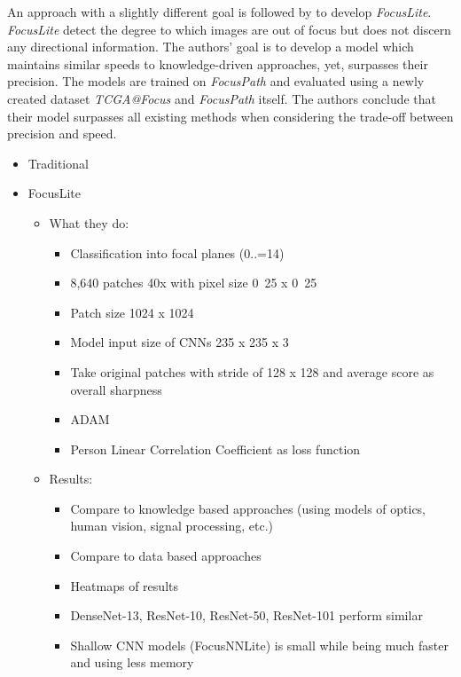 An approach with a slightly different goal is followed by \textcite{wang2020focuslitenn} to develop \emph{FocusLite}. \emph{FocusLite} detect the degree to which images are out of focus but does not discern any directional information. The authors' goal is to develop a model which maintains similar speeds to knowledge-driven approaches, yet, surpasses their precision. The models are trained on \emph{FocusPath} \cite{hosseini2019encoding} and evaluated using a newly created dataset \emph{TCGA@Focus} and \emph{FocusPath} itself.
The authors conclude that their model surpasses all existing methods when considering the trade-off between precision and speed.  


\begin{itemize}
    \item Traditional \cite{mateos-perez2012comparative}
    \item FocusLite \cite{wang2020focuslitenn}
    \begin{itemize}
        \item What they do:
        \begin{itemize}
            \item Classification into focal planes (0..=14) 
            \item 8,640 patches
            40x with pixel size \unit{0.25}{\micro\meter} x \unit{0.25}{\micro\meter}  
            \item Patch size 1024 x 1024
            \item Model input size of CNNs 235 x 235 x 3
            \item Take original patches with stride of 128 x 128 and average score as overall sharpness
            \item ADAM
            \item Person Linear Correlation Coefficient as loss function
        \end{itemize}
        \item Results:
        \begin{itemize}
            \item Compare to knowledge based approaches (using models of optics, human vision, signal processing, etc.)
            \item Compare to data based approaches
            \item Heatmaps of results
            \item DenseNet-13, ResNet-10, ResNet-50, ResNet-101 perform similar
            \item Shallow CNN models (FocusNNLite) is small while being much faster and using less memory

\end{itemize}
\end{itemize}
\end{itemize}
